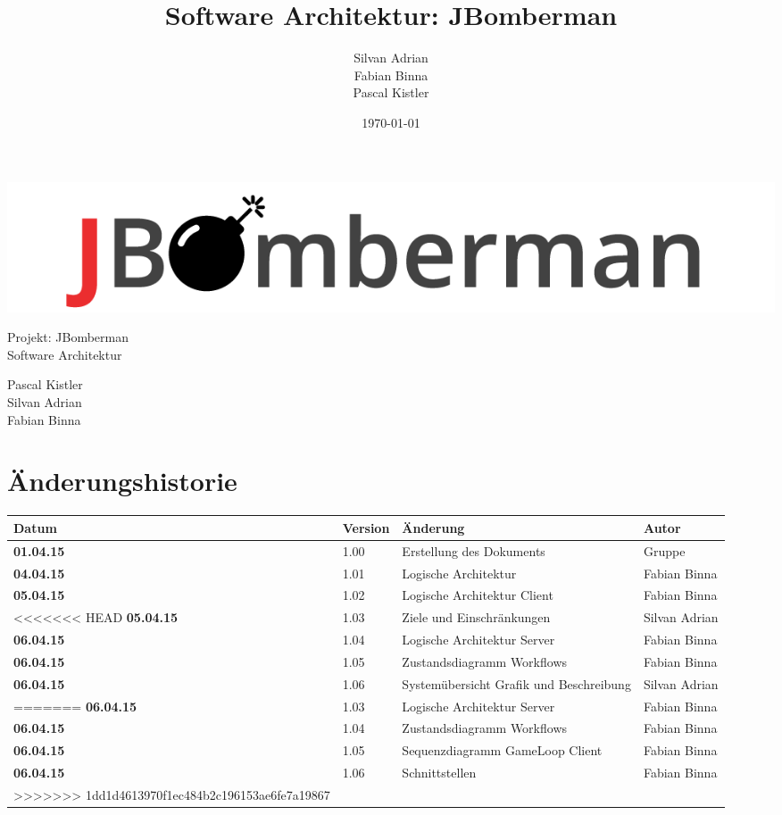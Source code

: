 \documentclass[11pt]{scrartcl}
\title{Software Architektur: JBomberman}
\author{Silvan Adrian \\ Fabian Binna \\ Pascal Kistler}
\date{\today{}}
\begin{document}
\def\arraystretch{1.5}
\begin{titlepage}
\begin{center}
\vspace{10em}
\includegraphics[scale=2]{jbomberman}
\vspace{10em}
\end{center}
\begin{center}
\huge {Projekt: JBomberman} \\
\huge {Software Architektur}
\end{center}
\begin{center}
\vspace{10em}
\LARGE {Pascal Kistler} \\
\LARGE {Silvan Adrian} \\
\LARGE {Fabian Binna}
\end{center}

\end{titlepage}

\newpage
\section{Änderungshistorie}
\label{sec:Änderungen}

\begin{tabularx}{\linewidth}{l l l l}
\textbf{Datum} & \textbf{Version} & \textbf{Änderung}  & \textbf{Autor} \\
\hline
\textbf{01.04.15} & 1.00 & Erstellung des Dokuments & Gruppe \\
\textbf{04.04.15} & 1.01 & Logische Architektur & Fabian Binna \\
\textbf{05.04.15} & 1.02 & Logische Architektur Client & Fabian Binna\\
<<<<<<< HEAD
\textbf{05.04.15} & 1.03 & Ziele und Einschränkungen & Silvan Adrian\\
\textbf{06.04.15} & 1.04 & Logische Architektur Server & Fabian Binna\\
\textbf{06.04.15} & 1.05 & Zustandsdiagramm Workflows & Fabian Binna\\
\textbf{06.04.15} & 1.06 & Systemübersicht Grafik und Beschreibung & Silvan Adrian\\
=======
\textbf{06.04.15} & 1.03 & Logische Architektur Server & Fabian Binna\\
\textbf{06.04.15} & 1.04 & Zustandsdiagramm Workflows & Fabian Binna\\
\textbf{06.04.15} & 1.05 & Sequenzdiagramm GameLoop Client & Fabian Binna\\
\textbf{06.04.15} & 1.06 & Schnittstellen & Fabian Binna\\
>>>>>>> 1dd1d4613970f1ec484b2c196153ae6fe7a19867
\end{tabularx}
\end{document}
